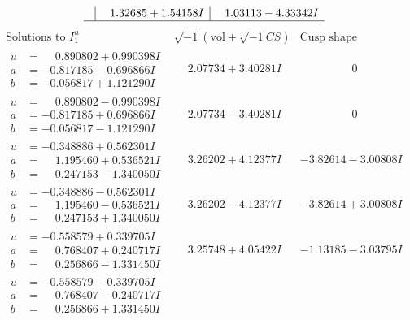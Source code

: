 \documentclass[1p]{elsarticle_modified}
\theoremstyle{definition}
\newcommand{\I}{\sqrt{-1}}
\begin{document}
$$\begin{array}{c|c|c}
 & \phantom{-}1.32685 + 1.54158 I & \phantom{-}1.03113 - 4.33342 I\\
 \hline 
 \end{array}$$\newpage$$\begin{array}{c|c|c}  
\text{Solutions to }I^u_{1}& \I (\text{vol} + \sqrt{-1}CS) & \text{Cusp shape}\\
 \hline 
\begin{aligned}
u &= \phantom{-}0.890802 + 0.990398 I \\
a &= -0.817185 - 0.696866 I \\
b &= -0.056817 + 1.121290 I\end{aligned}
 & \phantom{-}2.07734 + 3.40281 I & \phantom{-0.000000 } 0 \\ \hline\begin{aligned}
u &= \phantom{-}0.890802 - 0.990398 I \\
a &= -0.817185 + 0.696866 I \\
b &= -0.056817 - 1.121290 I\end{aligned}
 & \phantom{-}2.07734 - 3.40281 I & \phantom{-0.000000 } 0 \\ \hline\begin{aligned}
u &= -0.348886 + 0.562301 I \\
a &= \phantom{-}1.195460 + 0.536521 I \\
b &= \phantom{-}0.247153 - 1.340050 I\end{aligned}
 & \phantom{-}3.26202 + 4.12377 I & -3.82614 - 3.00808 I \\ \hline\begin{aligned}
u &= -0.348886 - 0.562301 I \\
a &= \phantom{-}1.195460 - 0.536521 I \\
b &= \phantom{-}0.247153 + 1.340050 I\end{aligned}
 & \phantom{-}3.26202 - 4.12377 I & -3.82614 + 3.00808 I \\ \hline\begin{aligned}
u &= -0.558579 + 0.339705 I \\
a &= \phantom{-}0.768407 + 0.240717 I \\
b &= \phantom{-}0.256866 - 1.331450 I\end{aligned}
 & \phantom{-}3.25748 + 4.05422 I & -1.13185 - 3.03795 I \\ \hline\begin{aligned}
u &= -0.558579 - 0.339705 I \\
a &= \phantom{-}0.768407 - 0.240717 I \\
b &= \phantom{-}0.256866 + 1.331450 I\end{aligned}

\end{array}$$
\end{document}
